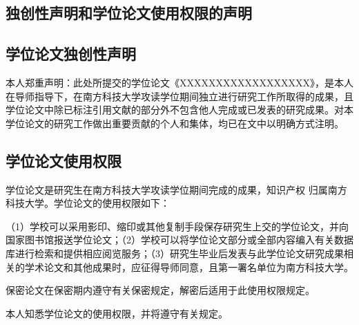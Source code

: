 \begin{statementcopyright}
  \chapter{独创性声明和学位论文使用权限的声明}
  \section*{学位论文独创性声明}
  \vspace{1em}

  \begin{spacing}{1.25}
    本人郑重声明：此处所提交的学位论文《XXXXXXXXXXXXXXXXXX》，是本人在导师指导下，在南方科技大学攻读学位期间独立进行研究工作所取得的成果，且学位论文中除已标注引用文献的部分外不包含他人完成或已发表的研究成果。对本学位论文的研究工作做出重要贡献的个人和集体，均已在文中以明确方式注明。
  \end{spacing}

  \authorsign

  \section*{学位论文使用权限}
  \vspace{1em}

  \begin{spacing}{1.25}
  学位论文是研究生在南方科技大学攻读学位期间完成的成果，知识产权
  归属南方科技大学。学位论文的使用权限如下：

  （1）学校可以采用影印、缩印或其他复制手段保存研究生上交的学位论文，并向国家图书馆报送学位论文；（2）学校可以将学位论文部分或全部内容编入有关数据库进行检索和提供相应阅览服务；（3）研究生毕业后发表与此学位论文研究成果相关的学术论文和其他成果时，应征得导师同意，且第一署名单位为南方科技大学。

  保密论文在保密期内遵守有关保密规定，解密后适用于此使用权限规定。

  本人知悉学位论文的使用权限，并将遵守有关规定。
  \end{spacing}

  \authorsupervisorsign

\end{statementcopyright}